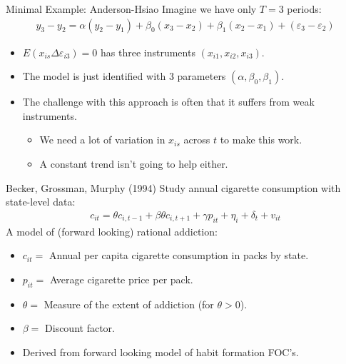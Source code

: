 \documentclass[xcolor=pdftex,dvipsnames,table,mathserif,aspectratio=169]{beamer}
\begin{document}
\begin{frame}{Minimal Example: Anderson-Hsiao}
Imagine we have only $T=3$ periods:
\begin{align*}
y_{3}-y_{2}=\alpha\left(y_{2}-y_{1}\right)+\beta_{0}\left(x_{3}-x_{2}\right)+\beta_{1}\left(x_{2}-x_{1}\right)+\left(\varepsilon_{3}-\varepsilon_{2}\right)
\end{align*}
\begin{itemize}
\item $E\left(x_{i s} \Delta \varepsilon_{i 3}\right)=0$ has three instruments $(x_{i1},x_{i2},x_{i3})$.
\item The model is \alert{just identified} with 3 parameters $(\alpha,\beta_0,\beta_1)$.
\item The challenge with this approach is often that it suffers from \alert{weak instruments}.
\begin{itemize}
\item We need a lot of variation in $x_{is}$ across $t$ to make this work.
\item A constant trend isn't going to help either.
\end{itemize}
\end{itemize}
\end{frame}

\begin{frame}{Becker, Grossman, Murphy (1994)}
Study annual cigarette consumption with state-level data:
\begin{align*}
c_{it} = \theta c_{i,t-1} +\beta \theta c_{i,t+1} + \gamma p_{it} + \eta_{i} + \delta_t + v_{it}
\end{align*}
A model of (forward looking) \alert{rational addiction}:
\begin{itemize}
\item $c_{it} = $ Annual per capita cigarette consumption in packs by state.
\item $p_{it} =$ Average cigarette price per pack.
\item $\theta = $ Measure of the extent of addiction (for $\theta > 0$).
\item $\beta= $ Discount factor.
\item Derived from forward looking model of \alert{habit formation} FOC's.
\end{itemize}
\end{frame}
\end{document}

